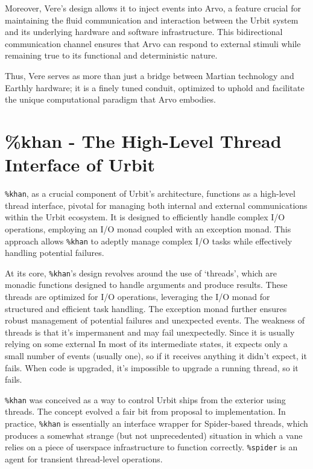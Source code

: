 \documentclass[twoside]{article}
\begin{document}
Moreover, Vere's design allows it to inject events into Arvo, a feature crucial for maintaining the fluid communication and interaction between the Urbit system and its underlying hardware and software infrastructure. This bidirectional communication channel ensures that Arvo can respond to external stimuli while remaining true to its functional and deterministic nature. 

Thus, Vere serves as more than just a bridge between Martian technology and Earthly hardware; it is a finely tuned conduit, optimized to uphold and facilitate the unique computational paradigm that Arvo embodies.


\section{\%khan - The High-Level Thread Interface of Urbit}

\texttt{\%khan}, as a crucial component of Urbit's architecture, functions as a high-level thread interface, pivotal for managing both internal and external communications within the Urbit ecosystem.
It is designed to efficiently handle complex I/O operations, employing an I/O monad coupled with an exception monad.
This approach allows \texttt{\%khan} to adeptly manage complex I/O tasks while effectively handling potential failures.

At its core, \texttt{\%khan}'s design revolves around the use of `threads', which are monadic functions designed to handle arguments and produce results.
These threads are optimized for I/O operations, leveraging the I/O monad for structured and efficient task handling. 
The exception monad further ensures robust management of potential failures and unexpected events.
The weakness of threads is that it's impermanent and may fail unexpectedly. 
Since it is usually relying on some external 
In most of its intermediate states, it expects only a small number of events (usually one), so if it receives anything it didn't expect, it fails.
When code is upgraded, it's impossible to upgrade a running thread, so it fails.

\texttt{\%khan} was conceived as a way to control Urbit ships from the exterior using threads.
The concept evolved a fair bit from proposal to implementation. 
In practice, \texttt{\%khan} is essentially an interface wrapper for Spider-based threads, which produces a somewhat strange (but not unprecedented) situation in which a vane relies on a piece of userspace infrastructure to function correctly.
\texttt{\%spider} is an agent for transient thread-level operations. 
\end{document}
